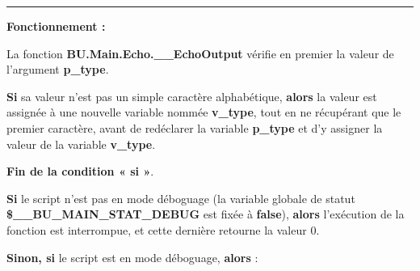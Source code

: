 \documentclass[a4paper,10pt]{article}
\begin{document}
    \setlength{\parskip}{2em}


    \par\noindent\rule{\textwidth}{0.4pt}\setlength{\parskip}{1em}

    \begin{justify}
        \textbf{Fonctionnement :}

        La fonction \textbf{\color{func}BU.Main.Echo.\_\_EchoOutput} vérifie en premier la valeur de l'argument \textbf{\color{vars}p\_type}.
    \end{justify}

    \begin{justify}
        \textbf{\color{cond}Si} sa valeur n'est pas un simple caractère alphabétique, \textbf{\color{cond}alors} la valeur est assignée à une nouvelle variable nommée \textbf{\color{vars}v\_type}, tout en ne récupérant que le premier caractère, avant de redéclarer la variable \textbf{\color{vars}p\_type} et d'y assigner la valeur de la variable \textbf{\color{vars}v\_type}.
    \end{justify}

    \begin{justify}
        \textbf{\color{cond}Fin de la condition « si »}.
    \end{justify}

    \setlength{\parskip}{2em}


    \begin{justify}
        \textbf{\color{cond}Si} le script n'est pas en mode déboguage (la variable globale de statut \textbf{\color{vars}\$\_\_BU\_MAIN\_STAT\_DEBUG} est fixée à \textbf{false}), \textbf{\color{cond}alors} l'exécution de la fonction est interrompue, et cette dernière retourne la valeur 0.
    \end{justify}

    \setlength{\parskip}{1em}

    \begin{justify}
        \textbf{\color{cond}Sinon, si} le script est en mode déboguage, \textbf{\color{cond}alors} :
    \end{justify}
\end{document}
